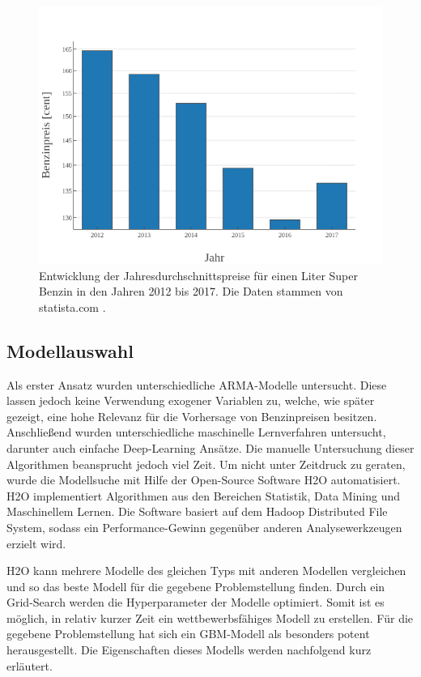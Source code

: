 \documentclass[
ngerman          %
,a4paper          %
,11pt
,pdftex
]{report}
\begin{document}
\begin{figure}
\centering
\includegraphics[width=0.7\linewidth]{Benzinpreisentwicklung_2012-2017.png}
\caption{Entwicklung der Jahresdurchschnittspreise für einen Liter Super Benzin in den Jahren 2012 bis 2017. Die Daten stammen von statista.com  \cite{stat}.}
\label{fig:bpe}
\end{figure}


\subsection{Modellauswahl}
Als erster Ansatz wurden unterschiedliche \ac{ARMA}-Modelle untersucht. Diese lassen jedoch keine Verwendung exogener Variablen zu, welche, wie später gezeigt, eine hohe Relevanz für die Vorhersage von Benzinpreisen besitzen. Anschließend wurden unterschiedliche maschinelle Lernverfahren untersucht, darunter auch einfache Deep-Learning Ansätze. Die manuelle Untersuchung dieser Algorithmen beansprucht jedoch viel Zeit. Um nicht unter Zeitdruck zu geraten, wurde die Modellsuche mit Hilfe der Open-Source Software H2O automatisiert. H2O implementiert Algorithmen aus den Bereichen Statistik, Data Mining und Maschinellem Lernen. Die Software basiert auf dem Hadoop Distributed File System, sodass ein Performance-Gewinn gegenüber anderen Analysewerkzeugen erzielt wird. \\
\par 
H2O kann mehrere Modelle des gleichen Typs mit anderen Modellen vergleichen und so das beste Modell für die gegebene Problemstellung finden. Durch ein Grid-Search werden die Hyperparameter der Modelle optimiert. Somit ist es möglich, in relativ kurzer Zeit ein wettbewerbsfähiges Modell zu erstellen. Für die gegebene Problemstellung hat sich ein \ac{GBM}-Modell als besonders potent herausgestellt. Die Eigenschaften dieses Modells werden nachfolgend kurz erläutert.
\end{document}
